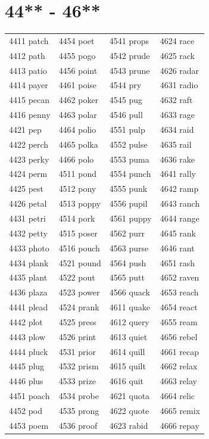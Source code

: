 \documentclass[12pt, oneside]{book}
\begin{document}
	\begin{table}[h]
		\centering
		\section*{44** - 46**}
		\begin{tabular}{l l l l}
			4411 patch & 4454 poet & 4541 props & 4624 race \\
			4412 path & 4455 pogo & 4542 prude & 4625 rack \\
			4413 patio & 4456 point & 4543 prune & 4626 radar\\
			4414 payer & 4461 poise & 4544 pry & 4631 radio\\
			4415 pecan & 4462 poker & 4545 pug & 4632 raft\\
			4416 penny & 4463 polar & 4546 pull & 4633 rage\\
			4421 pep & 4464 polio & 4551 pulp & 4634 raid\\
			4422 perch & 4465 polka & 4552 pulse & 4635 rail\\
			4423 perky & 4466 polo & 4553 puma & 4636 rake\\
			4424 perm & 4511 pond & 4554 punch & 4641 rally\\
			4425 pest & 4512 pony & 4555 punk & 4642 ramp\\
			4426 petal & 4513 poppy & 4556 pupil & 4643 ranch\\
			4431 petri & 4514 pork & 4561 puppy & 4644 range\\
			4432 petty & 4515 poser & 4562 purr & 4645 rank\\
			4433 photo & 4516 pouch & 4563 purse & 4646 rant\\
			4434 plank & 4521 pound & 4564 push & 4651 rash\\
			4435 plant & 4522 pout & 4565 putt & 4652 raven\\
			4436 plaza & 4523 power & 4566 quack & 4653 reach\\
			4441 plead & 4524 prank & 4611 quake & 4654 react\\
			4442 plot & 4525 press & 4612 query & 4655 ream\\
			4443 plow & 4526 print & 4613 quiet & 4656 rebel\\
			4444 pluck & 4531 prior & 4614 quill & 4661 recap\\
			4445 plug & 4532 prism & 4615 quilt & 4662 relax\\
			4446 plus & 4533 prize & 4616 quit & 4663 relay\\
			4451 poach & 4534 probe & 4621 quota & 4664 relic\\
			4452 pod & 4535 prong & 4622 quote & 4665 remix\\
			4453 poem & 4536 proof & 4623 rabid & 4666 repay\\
			
		\end{tabular}
	\end{table}
	
\end{document}
